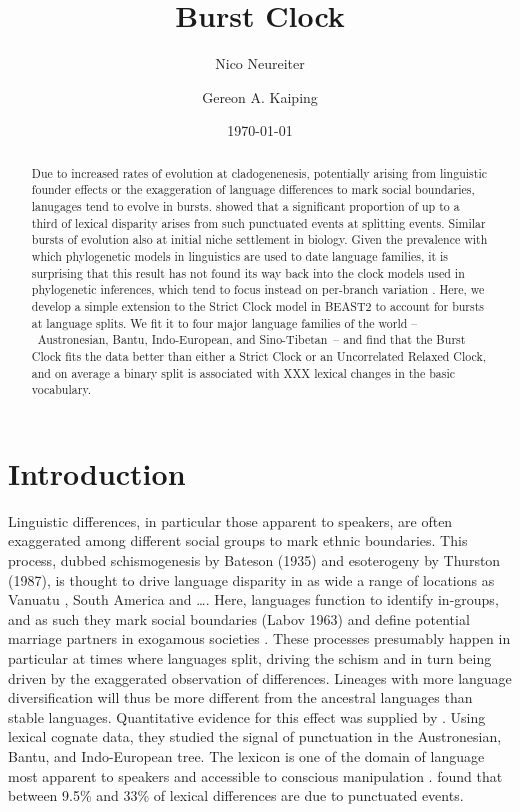 \documentclass[a4paper,12pt]{scrartcl}
\title{Burst Clock}
\date{\today}
\author[1]{Nico Neureiter}
\author[1]{Gereon A. Kaiping}
\affil[1]{Geographic Information Science Center, Universität Zürich, CH}
\begin{document}
\maketitle
\begin{abstract}
  Due to increased rates of evolution at cladogenenesis, potentially arising
  from linguistic founder effects or the exaggeration of language differences to
  mark social boundaries, lanugages tend to evolve in bursts.
  \Textcite{atkinson2008languages} showed that a significant proportion of up to
  a third of lexical disparity arises from such punctuated events at splitting
  events. Similar bursts of evolution also at initial niche settlement in
  biology. Given the prevalence with which phylogenetic models in linguistics
  are used to date language families, it is surprising that this result has not
  found its way back into the clock models used in phylogenetic inferences,
  which tend to focus instead on per-branch variation \parencite{}. Here, we
  develop a simple extension to the Strict Clock model \parencite{} in BEAST2
  \parencite{} to account for bursts at language splits. We fit it to four major
  language families of the world –~Austronesian, Bantu, Indo-European, and Sino-Tibetan~– and find that the Burst Clock fits the data better than either
  a Strict Clock or an Uncorrelated Relaxed Clock, and on average a binary split
  is associated with XXX lexical changes in the basic vocabulary.
\end{abstract}

\section{Introduction}
Linguistic differences, in particular those apparent to speakers, are often
exaggerated among different social groups to mark ethnic boundaries. This
process, dubbed schismogenesis by Bateson (1935) and esoterogeny by Thurston
(1987), is thought to drive language disparity in as wide a range of locations
as Vanuatu \parencite{}, South America \parencite{} and …. Here, languages
function to identify in-groups, and as such they mark social boundaries (Labov
1963) and define potential marriage partners in exogamous societies
\parencite{}. These processes presumably happen in particular at times where
languages split, driving the schism and in turn being driven by the exaggerated
observation of differences. Lineages with more language diversification will
thus be more different from the ancestral languages than stable languages.
Quantitative evidence for this effect was supplied by
\textcite{atkinson2008languages}. Using lexical cognate data, they studied the
signal of punctuation in the Austronesian, Bantu, and Indo-European tree. The
lexicon is one of the domain of language most apparent to speakers and
accessible to conscious manipulation \textcite{}.
 found that between 9.5\% and 33\% of lexical
differences are due to punctuated events.
\end{document}
